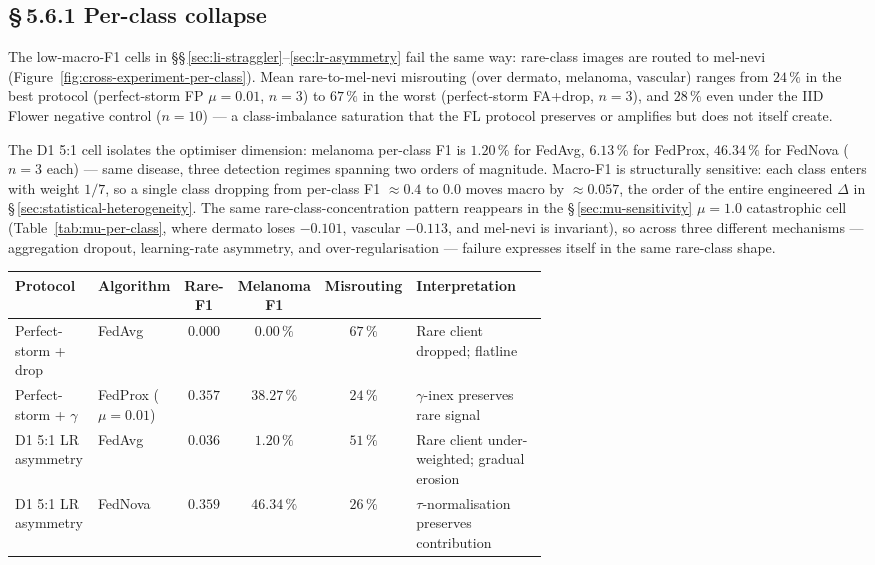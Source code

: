 \documentclass[11pt,a4paper]{report}
\begin{document}
\subsection*{\S\,5.6.1 Per-class collapse}

The low-macro-F1 cells in \S\S\,\ref{sec:li-straggler}--\ref{sec:lr-asymmetry}
fail the same way: rare-class images are routed to mel-nevi
(Figure~\ref{fig:cross-experiment-per-class}). Mean rare-to-mel-nevi
misrouting (over dermato, melanoma, vascular) ranges from $24\,\%$ in the
best protocol (perfect-storm FP $\mu = 0.01$, $n=3$) to $67\,\%$ in the
worst (perfect-storm FA+drop, $n=3$), and $28\,\%$ even under the IID
Flower negative control ($n=10$) --- a class-imbalance saturation that the
FL protocol preserves or amplifies but does not itself create.

The D1 5:1 cell isolates the optimiser dimension: melanoma per-class F1 is
$1.20\,\%$ for FedAvg, $6.13\,\%$ for FedProx, $46.34\,\%$ for FedNova
($n=3$ each) --- same disease, three detection regimes spanning two orders
of magnitude. Macro-F1 is structurally sensitive: each class enters with
weight $1/7$, so a single class dropping from per-class F1 $\approx 0.4$ to
$0.0$ moves macro by $\approx 0.057$, the order of the entire engineered
$\Delta$ in \S\,\ref{sec:statistical-heterogeneity}. The same
rare-class-concentration pattern reappears in the
\S\,\ref{sec:mu-sensitivity} $\mu = 1.0$ catastrophic cell
(Table~\ref{tab:mu-per-class}, where dermato loses $-0.101$, vascular
$-0.113$, and mel-nevi is invariant), so across three different mechanisms
--- aggregation dropout, learning-rate asymmetry, and over-regularisation
--- failure expresses itself in the same rare-class shape.

\begin{center}
\small
\begin{tabular}{p{0.16\linewidth} p{0.14\linewidth} c c c p{0.32\linewidth}}
\hline
Protocol                  & Algorithm & Rare-F1 & Melanoma F1 & Misrouting & Interpretation \\
\hline
Perfect-storm + drop      & FedAvg    & $0.000$ & $0.00\,\%$  & $67\,\%$   & Rare client dropped; flatline \\
Perfect-storm + $\gamma$  & FedProx ($\mu=0.01$) & $0.357$ & $38.27\,\%$ & $24\,\%$ & $\gamma$-inex preserves rare signal \\
D1 5:1 LR asymmetry       & FedAvg    & $0.036$ & $1.20\,\%$  & $51\,\%$   & Rare client under-weighted; gradual erosion \\
D1 5:1 LR asymmetry       & FedNova   & $0.359$ & $46.34\,\%$ & $26\,\%$   & $\tau$-normalisation preserves contribution \\
\hline
\end{tabular}
\end{center}
\end{document}

